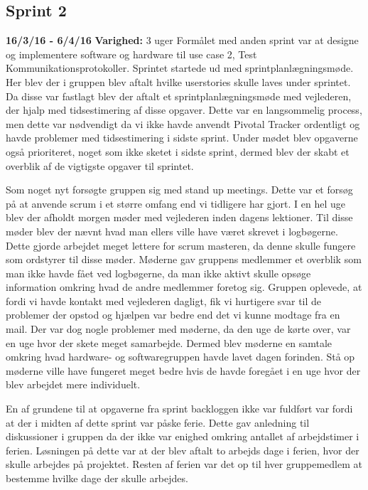 	
	
	\subsection{Sprint 2}
	\textbf{16/3/16 - 6/4/16}\newline
	\textbf{Varighed:} 3 uger\newline
	Formålet med anden sprint var at designe og implementere software og hardware til use case 2, Test Kommunikationsprotokoller. Sprintet startede ud med sprintplanlægningsmøde. Her blev der i gruppen blev aftalt hvilke userstories skulle laves under sprintet. Da disse var fastlagt blev der aftalt et sprintplanlægningsmøde med vejlederen, der hjalp med tidsestimering af disse opgaver. Dette var en langsommelig process, men dette var nødvendigt da vi ikke havde anvendt Pivotal Tracker ordentligt og havde problemer med tidsestimering i sidste sprint. Under mødet blev opgaverne også prioriteret, noget som ikke sketet i sidste sprint, dermed blev der skabt et overblik af de vigtigste opgaver til sprintet. \newline
	
	Som noget nyt forsøgte gruppen sig med stand up meetings. Dette var et forsøg på at anvende scrum i et større omfang end vi tidligere har gjort. I en hel uge blev der afholdt morgen møder med vejlederen inden dagens lektioner. Til disse møder blev der nævnt hvad man ellers ville have været skrevet i logbøgerne. Dette gjorde arbejdet meget lettere for scrum masteren, da denne skulle fungere som ordstyrer til disse møder. Møderne gav gruppens medlemmer et overblik som man ikke havde fået ved logbøgerne, da man ikke aktivt skulle opsøge information omkring hvad de andre medlemmer foretog sig. Gruppen oplevede, at fordi vi havde kontakt med vejlederen dagligt, fik vi hurtigere svar til de problemer der opstod og hjælpen var bedre end det vi kunne modtage fra en mail. Der var dog nogle problemer med møderne, da den uge de kørte over, var en uge hvor der skete meget samarbejde. Dermed blev møderne en samtale omkring hvad hardware- og softwaregruppen havde lavet dagen forinden. Stå op møderne ville have fungeret meget bedre hvis de havde foregået i en uge hvor der blev arbejdet mere individuelt. \newline
	
	En af grundene til at opgaverne fra sprint backloggen ikke var fuldført var fordi at der i midten af dette sprint var påske ferie. Dette gav anledning til diskussioner i gruppen da der ikke var enighed omkring antallet af arbejdstimer i ferien. Løsningen på dette var at der blev aftalt to arbejds dage i ferien, hvor der skulle arbejdes på projektet. Resten af ferien var det op til hver gruppemedlem at bestemme hvilke dage der skulle arbejdes. \newline
	
